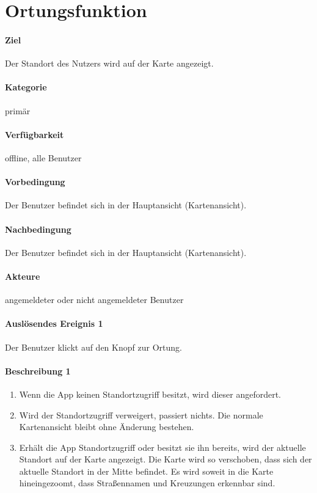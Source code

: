 \section{Ortungsfunktion}
\paragraph{Ziel}
Der Standort des Nutzers wird auf der Karte angezeigt.
\paragraph{Kategorie}
primär
\paragraph{Verfügbarkeit}
offline, alle Benutzer
\paragraph{Vorbedingung}
Der Benutzer befindet sich in der Hauptansicht (Kartenansicht).
\paragraph{Nachbedingung}
Der Benutzer befindet sich in der Hauptansicht (Kartenansicht).
\paragraph{Akteure}
angemeldeter oder nicht angemeldeter Benutzer
\paragraph{Auslösendes Ereignis 1}
Der Benutzer klickt auf den Knopf zur Ortung.
\paragraph{Beschreibung 1}
\begin{enumerate}
    \item Wenn die App keinen Standortzugriff besitzt, wird dieser angefordert.
    \item Wird der Standortzugriff verweigert, passiert nichts. Die normale Kartenansicht bleibt ohne Änderung bestehen.
    \item Erhält die App Standortzugriff oder besitzt sie ihn bereits, wird der aktuelle Standort auf der Karte angezeigt. Die Karte wird so verschoben, dass sich der aktuelle Standort in der Mitte befindet. Es wird soweit in die Karte hineingezoomt, dass Straßennamen und Kreuzungen erkennbar sind.
\end{enumerate}

